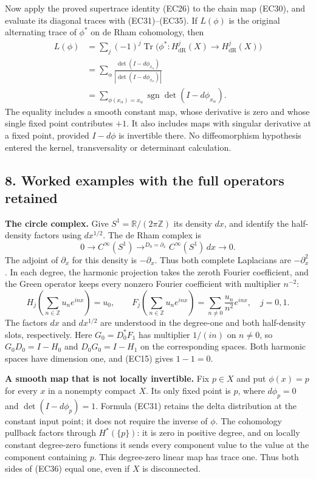 \documentclass[
  11pt,
]{article}
\begin{document}
Now apply the proved supertrace identity (EC26) to the chain map (EC30),
and evaluate its diagonal traces with (EC31)--(EC35). If \(L(\phi)\) is
the original alternating trace of \(\phi^*\) on de Rham cohomology, then
\[
 \begin{aligned}
 L(\phi)
 &=\sum_j(-1)^j
       \operatorname{Tr}\bigl(\phi^*:H^j_{\mathrm{dR}}(X)\to
                                    H^j_{\mathrm{dR}}(X)\bigr)\\
 &=\sum_\alpha
       \frac{\det(I-d\phi_{x_\alpha})}
            {|\det(I-d\phi_{x_\alpha})|}\\
 &=\sum_{\phi(x_\alpha)=x_\alpha}
         \operatorname{sgn}\det(I-d\phi_{x_\alpha}).
 \end{aligned}
 \tag{EC36}
\] The equality includes a smooth constant map, whose derivative is zero
and whose single fixed point contributes \(+1\). It also includes maps
with singular derivative at a fixed point, provided \(I-d\phi\) is
invertible there. No diffeomorphism hypothesis entered the kernel,
transversality or determinant calculation.

\subsection{8. Worked examples with the full operators
retained}\label{worked-examples-with-the-full-operators-retained}

\textbf{The circle complex.} Give \(S^1=\mathbb R/(2\pi\mathbb Z)\) its
density \(dx\), and identify the half-density factors using
\(dx^{1/2}\). The de Rham complex is \[
 0\longrightarrow C^\infty(S^1)
  \mathop{\longrightarrow}^{D_0=\partial_x}
 C^\infty(S^1)\,dx\longrightarrow0.
 \tag{EC37}
\] The adjoint of \(\partial_x\) for this density is \(-\partial_x\).
Thus both complete Laplacians are \(-\partial_x^2\). In each degree, the
harmonic projection takes the zeroth Fourier coefficient, and the Green
operator keeps every nonzero Fourier coefficient with multiplier
\(n^{-2}\): \[
 H_j\!\left(\sum_{n\in\mathbb Z}u_ne^{inx}\right)=u_0,\qquad
 F_j\!\left(\sum_{n\in\mathbb Z}u_ne^{inx}\right)
   =\sum_{n\ne0}\frac{u_n}{n^2}e^{inx},
 \quad j=0,1.
 \tag{EC38}
\] The factors \(dx\) and \(dx^{1/2}\) are understood in the degree-one
and both half-density slots, respectively. Here \(G_0=D_0^*F_1\) has
multiplier \(1/(in)\) on \(n\ne0\), so \(G_0D_0=I-H_0\) and
\(D_0G_0=I-H_1\) on the corresponding spaces. Both harmonic spaces have
dimension one, and (EC15) gives \(1-1=0\).

\textbf{A smooth map that is not locally invertible.} Fix \(p\in X\) and
put \(\phi(x)=p\) for every \(x\) in a nonempty compact \(X\). Its only
fixed point is \(p\), where \(d\phi_p=0\) and \(\det(I-d\phi_p)=1\).
Formula (EC31) retains the delta distribution at the constant input
point; it does not require the inverse of \(\phi\). The cohomology
pullback factors through \(H^*(\{p\})\): it is zero in positive degree,
and on locally constant degree-zero functions it sends every component
value to the value at the component containing \(p\). This degree-zero
linear map has trace one. Thus both sides of (EC36) equal one, even if
\(X\) is disconnected.
\end{document}

